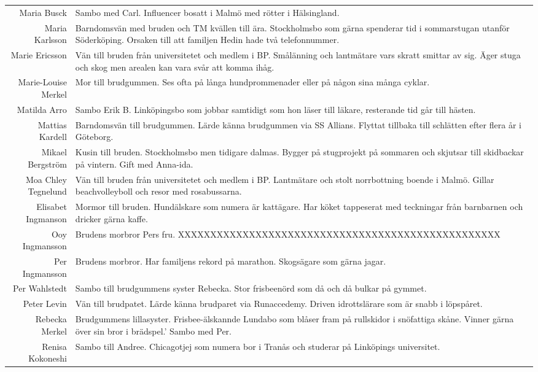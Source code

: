 \documentclass[a5paper]{article}
\begin{document}
\begin{longtable}[l]{N|L}
				Maria Busck	&	Sambo med Carl. Influencer bosatt i Malmö med rötter i Hälsingland. 	\\
				Maria Karlsson	&	Barndomsvän med bruden och TM kvällen till ära. Stockholmsbo som gärna spenderar tid i sommarstugan utanför Söderköping. Orsaken till att familjen Hedin hade två telefonnummer.	\\
				Marie Ericsson	&	Vän till bruden från universitetet och medlem i BP. Smålänning och lantmätare vars skratt smittar av sig. Äger stuga och skog men arealen kan vara svår att komma ihåg.	\\
				Marie-Louise Merkel	&	Mor till brudgummen. Ses ofta på långa hundprommenader eller på någon sina många cyklar.  	\\
				Matilda Arro	&	Sambo Erik B. Linköpingsbo som jobbar samtidigt som hon läser till läkare, resterande tid går till hästen. 	\\
				Mattias Kardell	&	Barndomsvän till brudgummen. Lärde känna brudgummen via SS Allians. Flyttat tillbaka till schlätten efter flera år i Göteborg.	\\
				Mikael Bergström	&	Kusin till bruden. Stockholmsbo men tidigare dalmas. Bygger på stugprojekt på sommaren och skjutsar till skidbackar på vintern. Gift med Anna-ida.	\\
				Moa Chley Tegnelund	&	Vän till bruden från universitetet och medlem i BP. Lantmätare och stolt norrbottning boende i Malmö. Gillar beachvolleyboll och resor med rosabussarna.  	\\
				Elisabet Ingmanson	&	Mormor till bruden. Hundälskare som numera är kattägare. Har köket tappeserat med teckningar från barnbarnen och dricker gärna kaffe.	\\
				Ooy Ingmansson	&	Brudens morbror Pers fru. XXXXXXXXXXXXXXXXXXXXXXXXXXXXXXXXXXXXXXXXXXXXXXXXXX	\\
				Per Ingmansson	&	Brudens morbror. Har familjens rekord på marathon. Skogsägare som gärna jagar. 	\\
				Per Wahlstedt	&	Sambo till brudgummens syster Rebecka. Stor frisbeenörd som då och då bulkar på gymmet. 	\\
				Peter Levin	&	Vän till brudpatet. Lärde känna brudparet via Runaccedemy. Driven idrottslärare som är snabb i löpspåret.	\\
				Rebecka Merkel	&	Brudgummens lillasyster. Frisbee-älskannde Lundabo som blåser fram på rullskidor i snöfattiga skåne. Vinner gärna över sin bror i brädspel.' Sambo med Per. 	\\
				Renisa Kokoneshi	&	Sambo till Andree. Chicagotjej som numera bor i Tranås och studerar på Linköpings universitet.	\\

\end{longtable}
\end{document}
